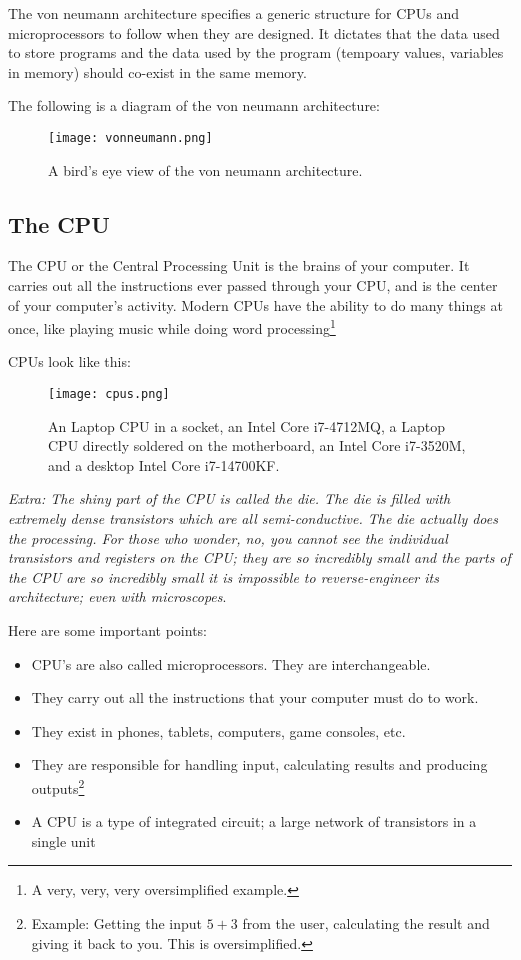 \documentclass[../main.tex]{subfiles}
\begin{document}
The von neumann architecture specifies a generic structure for CPUs and microprocessors to follow when they are designed. It dictates that the data used to store programs and the data used by the program (tempoary values, variables in memory) should co-exist in the same memory.

The following is a diagram of the von neumann architecture:

\begin{figure}[H]
    \centering
    \texttt{[image: vonneumann.png]}
    \caption{A bird's eye view of the von neumann architecture.}
    \label{fig:vonneumann}
\end{figure}

\subsection{The CPU}
\label{3:sec:cpu}

The CPU or the Central Processing Unit is the brains of your computer. It carries out all the instructions ever passed through your CPU, and is the center of your computer's activity. Modern CPUs have the ability to do many things at once, like playing music while doing word processing\footnote{A very, very, very oversimplified example.}

CPUs look like this:

\begin{figure}[H]
    \centering
    \texttt{[image: cpus.png]}
    \caption{An Laptop CPU in a socket, an Intel Core i7-4712MQ, a Laptop CPU directly soldered on the motherboard, an Intel Core i7-3520M, and a desktop Intel Core i7-14700KF.}
    \label{fig:cpus}
\end{figure}

\emph{Extra: The shiny part of the CPU is called the die. The die is filled with extremely dense transistors which are all semi-conductive. The die actually does the processing. For those who wonder, no, you cannot see the individual transistors and registers on the CPU; they are so incredibly small and the parts of the CPU are so incredibly small it is impossible to reverse-engineer its architecture; even with microscopes}.

Here are some important points:

\begin{itemize}
    \item CPU's are also called microprocessors. They are interchangeable.
    \item They carry out all the instructions that your computer must do to work.
    \item They exist in phones, tablets, computers, game consoles, etc.
    \item They are responsible for handling input, calculating results and producing outputs\footnote{Example: Getting the input $5+3$ from the user, calculating the result and giving it back to you. This is oversimplified.}
    \item A CPU is a type of integrated circuit; a large network of transistors in a single unit
\end{itemize}
\end{document}
